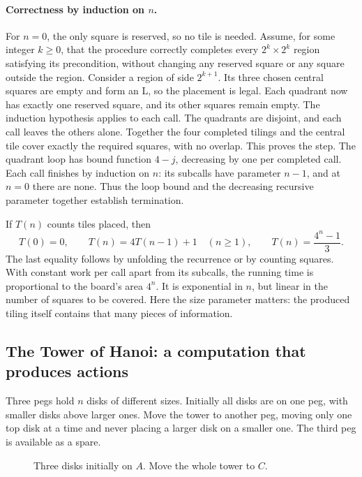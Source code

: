 \paragraph{Correctness by induction on $n$.}
For $n=0$, the only square is reserved, so no tile is needed. Assume, for
some integer $k\geq0$, that the procedure correctly completes every
$2^k\times2^k$ region satisfying its precondition, without changing any
reserved square or any square outside the region. Consider a region of
side $2^{k+1}$. Its three chosen central squares are empty and form an L,
so the placement is legal. Each quadrant now has exactly one reserved
square, and its other squares remain empty. The induction hypothesis
applies to each call. The quadrants are disjoint, and each call leaves the
others alone. Together the four completed tilings and the central tile
cover exactly the required squares, with no overlap. This proves the step.
The quadrant loop has bound function $4-j$, decreasing by one per
completed call. Each call finishes by induction on $n$: its subcalls
have parameter $n-1$, and at $n=0$ there are none. Thus the loop bound
and the decreasing recursive parameter together establish termination.

If $T(n)$ counts tiles placed, then
\[
T(0)=0,\qquad T(n)=4T(n-1)+1\quad(n\geq1),
\qquad T(n)=\frac{4^n-1}{3}.
\]
The last equality follows by unfolding the recurrence or by counting squares.
With constant work per call apart from its subcalls, the running time is
proportional to the board's area $4^n$. It is exponential in $n$, but linear
in the number of squares to be covered. Here the size parameter matters:
the produced tiling itself contains that many pieces of information.

\subsection{The Tower of Hanoi: a computation that produces actions}

Three pegs hold $n$ disks of different sizes. Initially all disks are on
one peg, with smaller disks above larger ones. Move the tower to another
peg, moving only one top disk at a time and never placing a larger disk
on a smaller one. The third peg is available as a spare.

\begin{figure}[ht]
\centering
{}
\caption{Three disks initially on $A$. Move the whole tower to $C$.}
\end{figure}

